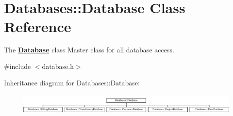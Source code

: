\hypertarget{classDatabases_1_1Database}{\section{Databases\-:\-:Database Class Reference}
\label{classDatabases_1_1Database}
}


The {\bfseries \hyperlink{classDatabases_1_1Database}{Database}} class Master class for all database access.  




{\ttfamily \#include $<$database.\-h$>$}

Inheritance diagram for Databases\-:\-:Database\-:\begin{figure}[H]
\begin{center}
\leavevmode
\includegraphics[height=1.076923cm]{dd/db0/classDatabases_1_1Database}
\end{center}
\end{figure}
